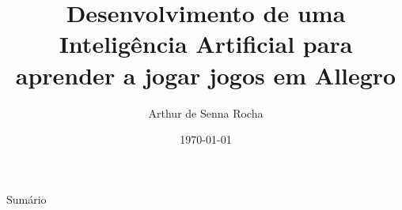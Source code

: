\documentclass[aspectratio=169]{beamer}
\title{Desenvolvimento de uma Inteligência Artificial para aprender a jogar jogos em Allegro}
\author{Arthur de Senna Rocha}
\institute{}
\institute[VFU] %
{
  	Universidade Federal de Minas Gerais
	\par
	Escola de Engenharia
  \and
  Trabalho de Conclusão de Curso II
}
\date{\today}
\begin{document}
\begin{frame}


\titlepage

\end{frame}


\begin{frame}{Sumário}
\tableofcontents
\end{frame}

\end{document}
